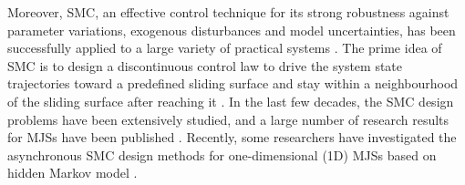 \documentclass[journal,final,twocolumn]{IEEEtran}
\begin{document}
	
	Moreover, SMC, an effective control technique for its strong robustness against parameter variations,  exogenous disturbances and model uncertainties, has been successfully applied to a large variety of practical systems \cite{utkin2009sliding,yang1999sliding,shima2006sliding}.  The prime idea of SMC is to design a discontinuous control law to drive the system state trajectories toward a predefined sliding surface and stay within a neighbourhood of the  sliding surface after reaching it \cite{edwards1998sliding}. In the last few decades, the SMC design problems have been extensively studied, and a large number of  research results for MJSs have been published \cite{li2015state,wu2010state,wang2017smc}. Recently, some researchers have investigated the asynchronous SMC design methods for one-dimensional (1D) MJSs based on hidden Markov model \cite{song2018asynchronous,li2017passivity,qi2018observer}. 
	
\end{document}
